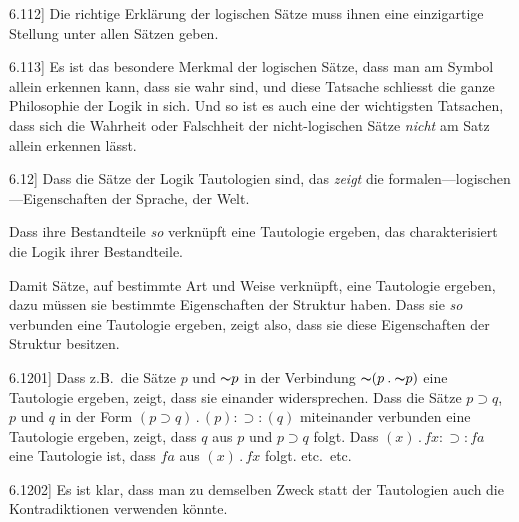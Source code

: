 \documentclass[12pt,oneside]{book}[2007/10/19]
\newcommand{\PropERef}[1]{\hyperref[PropE:#1]{#1}}
\newcommand{\PropositionG}[2]{%
  \item[\phantomsection\label{PropG:#1}\PropERef{#1}] #2%
}
\newcommand{\Not}[1]{\mathord{\thicksim} #1}
\newcommand{\DotOp}{\mathbin{.}}
\newcommand{\Implies}{\supset}
\newcommand{\Emph}[1]{\emph{#1}}%
\newcommand{\zumBeispiel}{z.\;B.}
\begin{document}
\begin{propositions}
\PropositionG{6.112}
{Die richtige Erklärung der logischen Sätze
muss ihnen eine einzigartige Stellung unter allen
Sätzen geben.}


\PropositionG{6.113}
{Es ist das besondere Merkmal der logischen
Sätze, dass man am Symbol allein erkennen kann,
dass sie wahr sind, und diese Tatsache schliesst
die ganze Philosophie der Logik in sich. Und
so ist es auch eine der wichtigsten Tatsachen, dass
sich die Wahrheit oder Falschheit der nicht-logischen
Sätze \Emph{nicht} am Satz allein erkennen
lässt.}


\PropositionG{6.12}
{Dass die Sätze der Logik Tautologien sind,
das \Emph{zeigt} die for\-ma\-len---lo\-gi\-schen---Ei\-gen\-schaf\-ten
der Sprache, der Welt.

Dass ihre Bestandteile \Emph{so} verknüpft eine Tautologie
ergeben, das charakterisiert die Logik ihrer
Bestandteile.

Damit Sätze, auf bestimmte Art und Weise
verknüpft, eine Tautologie ergeben, dazu müssen
sie bestimmte Eigenschaften der Struktur haben.
Dass sie \Emph{so} verbunden eine Tautologie ergeben,
zeigt also, dass sie diese Eigenschaften der Struktur
besitzen.}


\PropositionG{6.1201}
{Dass \zumBeispiel\ die Sätze \glqq{}$p$\grqq{} und \glqq{}$\Not{p}$\grqq{} in der
Verbindung \glqq{}$\Not{(p \DotOp \Not{p})}$\grqq{} eine Tautologie ergeben,
zeigt, dass sie einander widersprechen. Dass
die Sätze \glqq{}$p \Implies q$\grqq{}, \glqq{}$p$\grqq{} und \glqq{}$q$\grqq{} in der Form
\glqq{}$(p \Implies q) \DotOp (p) : \Implies : (q)$\grqq{} miteinander verbunden eine
Tautologie ergeben, zeigt, dass $q$ aus $p$ und $p \Implies q$
folgt. Dass \glqq{}$(x) \DotOp fx : \Implies : fa$\grqq{} eine Tautologie ist,
dass $fa$ aus $(x) \DotOp fx$ folgt.{} etc.\ etc.}


\PropositionG{6.1202}
{Es ist klar, dass man zu demselben Zweck statt
der Tautologien auch die Kontradiktionen verwenden
könnte.}



\end{propositions}
\end{document}

